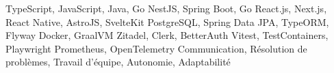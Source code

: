 \begin{cvskills}

   {TypeScript, JavaScript, Java, Go}
   {NestJS, Spring Boot, Go}
   {React.js, Next.js, React Native, AstroJS, SvelteKit}
   {PostgreSQL, Spring Data JPA, TypeORM, Flyway}
   {Docker, GraalVM}
   {Zitadel, Clerk, BetterAuth}
   {Vitest, TestContainers, Playwright}
   {Prometheus, OpenTelemetry}
   {Communication, Résolution de problèmes, Travail d’équipe, Autonomie, Adaptabilité}

\end{cvskills}
